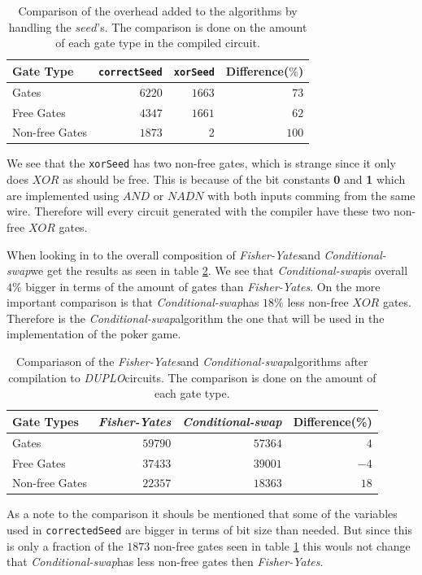 \documentclass[twoside,11pt,openright]{report}
\newcommand{\FY}{\textit{Fisher-Yates}}
\newcommand{\CS}{\textit{Conditional-swap}}
\newcommand{\DUPLO}{\textit{DUPLO}}
\begin{document}
\begin{table}
\centering
\begin{tabular}{l || r r r}
Gate Type      & \verb|correctSeed| & \verb|xorSeed| & Difference($\%$)    \\
\hline
Gates          & $6220$             & $1663$         &  $73$ \\
Free Gates     & $4347$             & $1661$         &  $62$ \\
Non-free Gates & $1873$             &    $2$         & $100$
\end{tabular}
\caption{Comparison of the overhead added to the algorithms by handling the $seed$'s. The comparison is done on the amount of each gate type in the compiled circuit.}
\label{table:alg_preprocess_overhead}
\end{table}

We see that the \verb|xorSeed| has two non-free gates, which is strange since it only does $XOR$ as should be free. This is because of the bit constants \textbf{0} and \textbf{1} which are implemented using $AND$ or $NADN$ with both inputs comming from the same wire. Therefore will every circuit generated with the compiler have these two non-free $XOR$ gates.

\bigskip

When looking in to the overall composition of \FY and \CS we get the results as seen in table \ref{table:circuit_gate_types}. We see that \CS is overall $4\%$ bigger in terms of the amount of gates than \FY. On the more important comparison is that \CS has $18\%$ less non-free $XOR$ gates. Therefore is the \CS algorithm the one that will be used in the implementation of the poker game.

\begin{table}
\centering
\begin{tabular}{l || r | r | r}
Gate Types     & \FY     & \CS     & Difference(\%) \\
\hline
Gates          & $59790$ & $57364$ &  $4$   \\
Free Gates     & $37433$ & $39001$ & $-4$   \\
Non-free Gates & $22357$ & $18363$ & $18$
\end{tabular}
\caption{Compariason of the \FY and \CS algorithms after compilation to \DUPLO circuits. The comparison is done on the amount of each gate type.}
\label{table:circuit_gate_types}
\end{table}

As a note to the comparison it shouls be mentioned that some of the variables used in \verb|correctedSeed| are bigger in terms of bit size than needed. But since this is only a fraction of the $1873$ non-free gates seen in table \ref{table:alg_preprocess_overhead} this wouls not change that \CS has less non-free gates then \FY .
\end{document}
